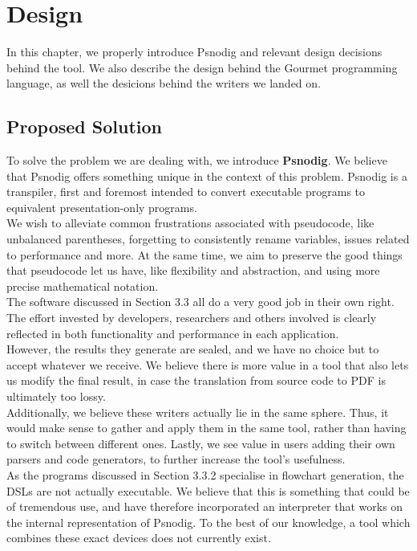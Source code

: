 \chapter{Design}

In this chapter, we properly introduce Psnodig and relevant design decisions behind the tool. We also describe the design behind the Gourmet programming language, as well the desicions behind the writers we landed on.

\section{Proposed Solution}

To solve the problem we are dealing with, we introduce \textbf{Psnodig}. We believe that Psnodig offers something unique in the context of this problem. Psnodig is a transpiler, first and foremost intended to convert executable programs to equivalent presentation-only programs. \\

We wish to alleviate common frustrations associated with pseudocode, like unbalanced parentheses, forgetting to consistently rename variables, issues related to performance and more. At the same time, we aim to preserve the good things that pseudocode let us have, like flexibility and abstraction, and using more precise mathematical notation. \\

The software discussed in Section 3.3 all do a very good job in their own right. The effort invested by developers, researchers and others involved is clearly reflected in both functionality and performance in each application. \\

However, the results they generate are sealed, and we have no choice but to accept whatever we receive. We believe there is more value in a tool that also lets us modify the final result, in case the translation from source code to PDF is ultimately too lossy. \\

Additionally, we believe these writers actually lie in the same sphere. Thus, it would make sense to gather and apply them in the same tool, rather than having to switch between different ones. Lastly, we see value in users adding their own parsers and code generators, to further increase the tool's usefulness. \\

As the programs discussed in Section 3.3.2 specialise in flowchart generation, the DSLs are not actually executable. We believe that this is something that could be of tremendous use, and have therefore incorporated an interpreter that works on the internal representation of Psnodig. To the best of our knowledge, a tool which combines these exact devices does not currently exist.

